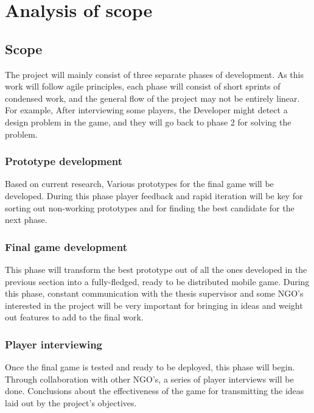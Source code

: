 \chapter{Analysis of scope}

\section{Scope}

The project will mainly consist of three separate phases of development. As this work will follow agile principles, each phase will consist of short sprints of condensed work, and the general flow of the project may not be entirely linear. For example, After interviewing some players, the Developer might detect a design problem in the game, and they will go back to phase 2 for solving the problem.

\subsection{Prototype development}

Based on current research, Various prototypes for the final game will be developed. During this phase player feedback and rapid iteration will be key for sorting out non-working prototypes and for finding the best candidate for the next phase. 

\subsection{Final game development}

This phase will transform the best prototype out of all the ones developed in the previous section into a fully-fledged, ready to be distributed mobile game. During this phase, constant communication with the thesis supervisor and some NGO's interested in the project will be very important for bringing in ideas and weight out features to add to the final work. 

\subsection{Player interviewing}

Once the final game is tested and ready to be deployed, this phase will begin. Through collaboration with other NGO's, a series of player interviews will be done. Conclusions about the effectiveness of the game for transmitting the ideas laid out by the project's objectives.

